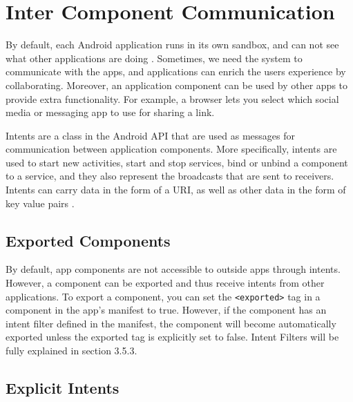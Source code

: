     
    
    \section{Inter Component Communication}
        \label{sec:inter_component_communication}
    
    By default, each Android application runs in its own sandbox, and can not see what other applications are doing \cite{android_app_fundamentals}. Sometimes, we need the system to communicate with the apps, and applications can enrich the users experience by collaborating. Moreover, an application component can be used by other apps to provide extra functionality. For example, a browser lets you select which social media or messaging app to use for sharing a link.
    
    Intents are a class in the Android API that are used as messages for communication between application components. More specifically, intents are used to start new activities, start and stop services, bind or unbind a component to a service, and they also represent the broadcasts that are sent to receivers. Intents can carry data in the form of a URI, as well as other data in the form of key value pairs \cite{intents}.
    
    \subsection{Exported Components}
        \label{subsec:exported_components}
        
    By default, app components are not accessible to outside apps through intents. However, a component can be exported and thus receive intents from other applications. To export a component, you can set the \lstinline|<exported>| tag in a component in the app’s manifest to true. However, if the component has an intent filter defined in the manifest, the component will become automatically exported unless the exported tag is explicitly set to false. Intent Filters will be fully explained in section 3.5.3.
    
    \subsection{Explicit Intents}
        \label{subsec:explicit_intents}
        

